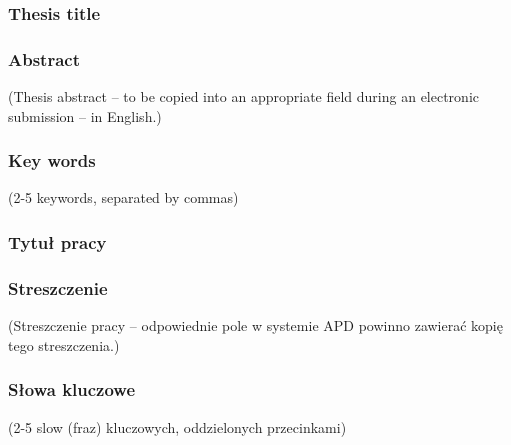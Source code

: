 \documentclass[a4paper,twoside,12pt]{book}
\begin{document}
\cleardoublepage

\rmfamily\normalfont
\pagestyle{empty}



\subsubsection*{Thesis title}  
\Title

\subsubsection*{Abstract} 
(Thesis abstract – to be copied into an appropriate field during an electronic submission – in English.)

\subsubsection*{Key words}  
(2-5 keywords, separated by commas)

\subsubsection*{Tytuł pracy}
\begin{otherlanguage}{polish}
\TitleAlt
\end{otherlanguage}

\subsubsection*{Streszczenie} 
\begin{otherlanguage}{polish}
(Streszczenie pracy – odpowiednie pole w systemie APD powinno zawierać kopię tego streszczenia.)
\end{otherlanguage}

\subsubsection*{Słowa kluczowe} 
\begin{otherlanguage}{polish}
(2-5 slow (fraz) kluczowych, oddzielonych przecinkami)
\end{otherlanguage}




\tableofcontents
\end{document}
